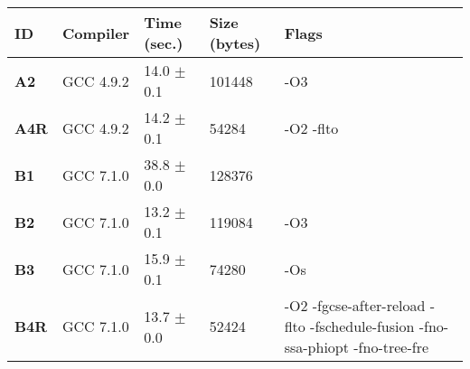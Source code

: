     \begin{tabular}{|l|l|l|l|p{3.2in}|}
     \hline
      \textbf{ID} & \textbf{Compiler} & \textbf{Time (sec.)} & \textbf{Size (bytes)} & \textbf{Flags} \\ 
     \hline
      \textbf{ A2 } &  GCC 4.9.2  &  14.0 $\pm$ 0.1  &  101448  & {\small -O3 }\\
     \hline
      \textbf{ A4R } &  GCC 4.9.2  &  14.2 $\pm$ 0.1  &  54284  & {\small -O2 -flto }\\
     \hline
      \textbf{ B1 } &  GCC 7.1.0  &  38.8 $\pm$ 0.0  &  128376  & {\small  }\\
     \hline
      \textbf{ B2 } &  GCC 7.1.0  &  13.2 $\pm$ 0.1  &  119084  & {\small -O3 }\\
     \hline
      \textbf{ B3 } &  GCC 7.1.0  &  15.9 $\pm$ 0.1  &  74280  & {\small -Os }\\
     \hline
      \textbf{ B4R } &  GCC 7.1.0  &  13.7 $\pm$ 0.0  &  52424  & {\small -O2 -fgcse-after-reload -flto -fschedule-fusion -fno-ssa-phiopt -fno-tree-fre }\\
     \hline
    \end{tabular}    